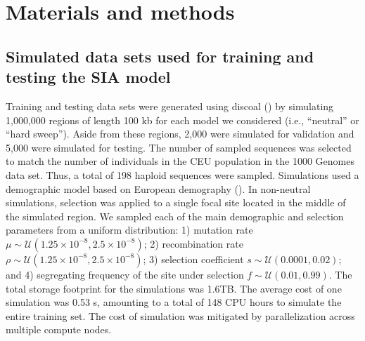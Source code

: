\section{Materials and methods} \label{methods}

\subsection{Simulated data sets used for training and testing the \ac{SIA} model}
Training and testing data sets were generated using discoal (\cite{kern_discoal_2016}) by simulating 1,000,000 regions of length 100 kb for each model we considered (i.e., “neutral” or “hard sweep”). Aside from these regions, 2,000 were simulated for validation and 5,000 were simulated for testing. The number of sampled sequences was selected to match the number of individuals in the CEU population in the 1000 Genomes data set. Thus, a total of 198 haploid sequences were sampled. Simulations used a demographic model based on European demography (\cite{tennessen_evolution_2012}). In non-neutral simulations, selection was applied to a single focal site located in the middle of the simulated region. We sampled each of the main demographic and selection parameters from a uniform distribution: 1) mutation rate $\mu \sim \mathcal{U}(1.25\times 10^{-8}, 2.5\times 10^{-8})$; 2) recombination rate $\rho \sim \mathcal{U}(1.25\times 10^{-8}, 2.5\times 10^{-8})$; 3) selection coefficient $s \sim \mathcal{U}(0.0001, 0.02)$; and 4) segregating frequency of the site under selection $f \sim \mathcal{U}(0.01, 0.99)$. The total storage footprint for the simulations was 1.6TB. The average cost of one simulation was 0.53 s, amounting to a total of 148 CPU hours to simulate the entire training set. The cost of simulation was mitigated by parallelization across multiple compute nodes.


